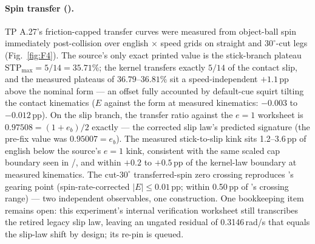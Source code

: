 \paragraph{Spin transfer ().}
TP A.27's friction-capped transfer curves were measured from object-ball
spin immediately post-collision over english $\times$ speed grids on
straight and $30^\circ$-cut legs (Fig.~\ref{fig:F4}). The source's only
exact printed value is the stick-branch plateau
$\mathrm{STP}_{\max} = 5/14 = 35.71\%$; the kernel transfers exactly
$5/14$ of the contact slip, and the measured plateaus of
$36.79$--$36.81\%$ sit a speed-independent $+1.1$\,pp above the nominal
form --- an offset fully accounted by default-cue squirt tilting the
contact kinematics ($E$ against the form at measured kinematics:
$-0.003$ to $-0.012$\,pp). On the slip branch, the transfer ratio
against the $e = 1$ worksheet is $0.97508 = (1+e_b)/2$ exactly --- the
corrected slip law's predicted signature (the pre-fix value was
$0.95007 = e_b$). The measured stick-to-slip kink sits 1.2--3.6\,pp of
english below the source's $e = 1$ kink, consistent with the same scaled
cap boundary seen in /, and within $+0.2$ to
$+0.5$\,pp of the kernel-law boundary at measured kinematics. The
cut-$30^\circ$ transferred-spin zero crossing reproduces 's
gearing point (spin-rate-corrected $|E| \le 0.01$\,pp; within 0.50\,pp
of 's crossing range) --- two independent observables, one
construction. One bookkeeping item remains open: this experiment's
internal verification worksheet still transcribes the retired legacy
slip law, leaving an ungated residual of 0.3146\,rad/s that equals the
slip-law shift by design; its re-pin is queued.

